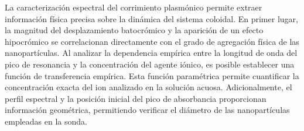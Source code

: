 La caracterización espectral del corrimiento plasmónico permite extraer
información física precisa sobre la dinámica del sistema coloidal. En primer
lugar, la magnitud del desplazamiento batocrómico y la aparición de un efecto
hipocrómico se correlacionan directamente con el grado de agregación física de
las nanopartículas. Al analizar la dependencia empírica entre
la longitud de onda del pico de resonancia y la concentración del agente
iónico, es posible establecer una función de transferencia empírica. Esta
función paramétrica permite cuantificar la concentración exacta del ion
analizado en la solución acuosa. Adicionalmente, el perfil
espectral y la posición inicial del pico de absorbancia proporcionan
información geométrica, permitiendo verificar el diámetro de las
nanopartículas empleadas en la sonda.
